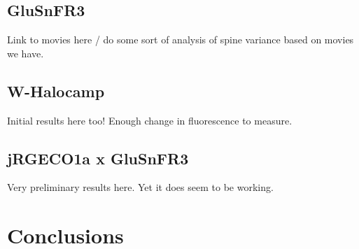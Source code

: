 \documentclass[a4paper,12pt]{article}
\begin{document}
\subsection{GluSnFR3}

Link to movies here / do some sort of analysis of spine variance based on movies we have. 

\subsection{W-Halocamp}

Initial results here too!  Enough change in fluorescence to measure.  

\subsection{jRGECO1a x GluSnFR3}

Very preliminary results here.  Yet it does seem to be working. 

\section{Conclusions}
\end{document}
